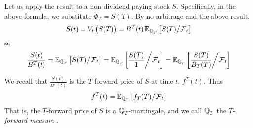 \documentclass[11pt]{article}
\begin{document}
Let us apply the result to a non-dividend-paying stock $S$. Specifically, in the above formula, we substitute $\widetilde{\Phi}_T = S(T)$. By no-arbitrage and the above result, 
$$ S(t) = V_t\left(S(T)\right) = B^T(t) \operatorname{\mathbb E}_{\operatorname{\mathbb Q}_T} \left[ S(T) \middle/ \operatorname{\mathcal F}_t \right]$$
so
$$ \frac{S(t)}{B^T(t)} = \operatorname{\mathbb E}_{\operatorname{\mathbb Q}_T} \left[ S(T) \middle/ \operatorname{\mathcal F}_t \right] = \operatorname{\mathbb E}_{\operatorname{\mathbb Q}_T} \left[ \frac{S(T)}{1} \middle/ \operatorname{\mathcal F}_t \right] = \operatorname{\mathbb E}_{\operatorname{\mathbb Q}_T} \left[ \frac{S(T)}{B_T(T)} \middle/ \operatorname{\mathcal F}_t \right] $$
\begin{remark}[Geman 1989]
We recall that $\frac {S(t)}{B^T(t)}$ is the $T$-forward price of $S$ at time $t$, $f^T(t)$.
Thus  
$$ f^T(t) = \operatorname{\mathbb E}_{\operatorname{\mathbb Q}_T} \left[ f_T(T) \middle/ \operatorname{\mathcal F}_t \right]$$
That is, the $T$-forward price of $S$ is a $\operatorname{\mathbb Q}_T$-martingale, and we call $\operatorname{\mathbb Q}_T$ the {\em $T$-forward measure} .
\end{remark}
\end{document}
